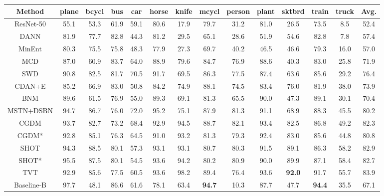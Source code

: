 \documentclass[dvipsnames, svgnames, x11names, table]{article} \usepackage{iclr2022_conference,times}
\begin{document}
\begin{spacing}{1.0}
\begin{table*}[!t]\small
\setlength\tabcolsep{3.4pt}
\begin{tabular}{c|cccccccccccc>{\columncolor{lightgray}}c}
\hline
Method    & plane & bcycl & bus   & car   & horse & knife & mcycl & person & plant & sktbrd & train & truck & Avg.  \\ \hline
ResNet-50    & 55.1  & 53.3    & 61.9  & 59.1  & 80.6  & 17.9  & 79.7  & 31.2   & 81.0  & 26.5       & 73.5  & 8.5   & 52.4 \\
DANN      & 81.9  & 77.7    & 82.8  & 44.3  & 81.2  & 29.5  & 65.1  & 28.6   & 51.9  & 54.6       & 82.8  & 7.8   & 57.4 \\
MinEnt    & 80.3  & 75.5    & 75.8  & 48.3  & 77.9  & 27.3  & 69.7  & 40.2   & 46.5  & 46.6       & 79.3  & 16.0  & 57.0 \\
MCD       & 87.0  & 60.9    & 83.7  & 64.0  & 88.9  & 79.6  & 84.7  & 76.9   & 88.6  & 40.3       & 83.0  & 25.8  & 71.9 \\
SWD       & 90.8  & 82.5    & 81.7  & 70.5  & 91.7  & 69.5  & 86.3  & 77.5   & 87.4  & 63.6       & 85.6  & 29.2  & 76.4 \\
CDAN+E    & 85.2  & 66.9    & 83.0  & 50.8  & 84.2  & 74.9  & 88.1  & 74.5   & 83.4  & 76.0       & 81.9  & 38.0  & 73.9 \\
BNM       & 89.6  & 61.5    & 76.9  & 55.0  & 89.3  & 69.1  & 81.3  & 65.5   & 90.0  & 47.3       & 89.1  & 30.1  & 70.4 \\
MSTN+DSBN & 94.7  & 86.7    & 76.0  & 72.0  & 95.2  & 75.1  & 87.9  & 81.3   & 91.1  & 68.9       & 88.3  & 45.5  & 80.2 \\
CGDM      & 93.7  & 82.7    & 73.2  & 68.4  & 92.9  & 94.5  & 88.7  & 82.1   & 93.4  & 82.5       & 86.8  & 49.2  & 82.3 \\
CGDM*  & 92.8 & 85.1 & 76.3 & 64.5 & 91.0 & 93.2 & 81.3 & 79.3 & 92.4 & 83.0 & 85.6 & 44.8 & 80.8 \\
SHOT      & 94.3  & 88.5    & 80.1  & 57.3  & 93.1  & 93.1  & 80.7  & 80.3   & 91.5  & 89.1   & 86.3  & 58.2  & 82.9 \\ 
SHOT* & 95.5 & 87.5 & 80.1 & 54.5 & 93.6 & 94.2 & 80.2 & 80.9 & 90.0 & 89.9 & 87.1 & 58.4 & 82.7 \\
TVT & 92.9 & 85.6 & 77.5 & 60.5 & 93.6 & 98.2 & 89.4 & 76.4 & 93.6 & \textbf{92.0} & 91.7 & 55.7 & 83.9 \\
\hline
Baseline-B & 97.7 & 48.1 & 86.6 & 61.6 & 78.1 & 63.4 & \textbf{94.7} & 10.3 & 87.7 & 47.7 & \textbf{94.4} & 35.5 & 67.1 \\

\end{tabular}
\end{table*}
\end{spacing}
\end{document}
